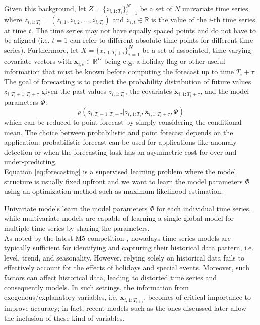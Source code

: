 \documentclass[a4paper]{article} %
\begin{document}
	Given this background, let $Z=\{ z_{i, 1:T_i} \}_{i=1}^{N}$ be a  set of $N$ univariate time series where $z_{i, 1:T_i} = (z_{i,1}, z_{i,2}, ..., z_{i,T_i})$ and $z_{i,t} \in \mathbb{R}$ is the value of the $i$-th time series at time $t$. The time series may not have equally spaced points and do not have to be aligned (i.e. $t=1$ can refer to different absolute time points for different time series). Furthermore, let $X=\{ x_{i, 1:T_i+\tau} \}_{i=1}^{N}$ be a set of associated, time-varying covariate vectors with $\pmb{x}_{i,t} \in \mathbb{R}^D$ being e.g. a holiday flag or other useful information that must be known before computing the forecast up to time $T_i + \tau$.\\
	The goal of forecasting \cite{ForecastingHyndmanAthanasopoulos} is to predict the probability distribution of future values $z_{i,T_{i}+1:T_i+\tau}$ given the past values $z_{i, 1:T_i}$, the covariates $\pmb{x}_{i, 1:T_i + \tau}$, and the model parameters $\Phi$:
	\begin{equation} \label{eq:forecasting}
		p(z_{i,T_{i}+1:T_i+\tau} | z_{i, 1:T_i}, \pmb{x}_{i, 1:T_i + \tau}, \Phi)
	\end{equation}
	which can be reduced to point forecast by simply considering the conditional mean. The choice between probabilistic and point forecast depends on the application: probabilistic forecast can be used for applications like anomaly detection or when the forecasting task has an asymmetric cost for over and under-predicting. \\
	Equation \ref{eq:forecasting} is a supervised learning problem where the model structure is usually fixed upfront and we want to learn the model parameters $\Phi$ using an optimization method such as maximum likelihood estimation.
	
	Univariate models learn the model parameters $\Phi$ for each individual time series, while multivariate models are capable of learning a single global model for multiple time series by sharing the parameters.\\
	As noted by the latest M5 competition \cite{M5Competition}, nowadays time series models are typically sufficient for identifying and capturing their historical data pattern, i.e. level, trend, and seasonality. However, relying solely on historical data fails to effectively account for the effects of holidays and special events. Moreover, such factors can affect historical data, leading to distorted time series and consequently models. In such settings, the information from exogenous/explanatory variables, i.e.  $\pmb{x}_{i, 1:T_{i+\tau}}$, becomes of critical importance to improve accuracy; in fact, recent models such as the ones discussed later \cite{FacebookProphet, DeepAR, DeepState} allow the inclusion of these kind of variables.
	
\end{document}
